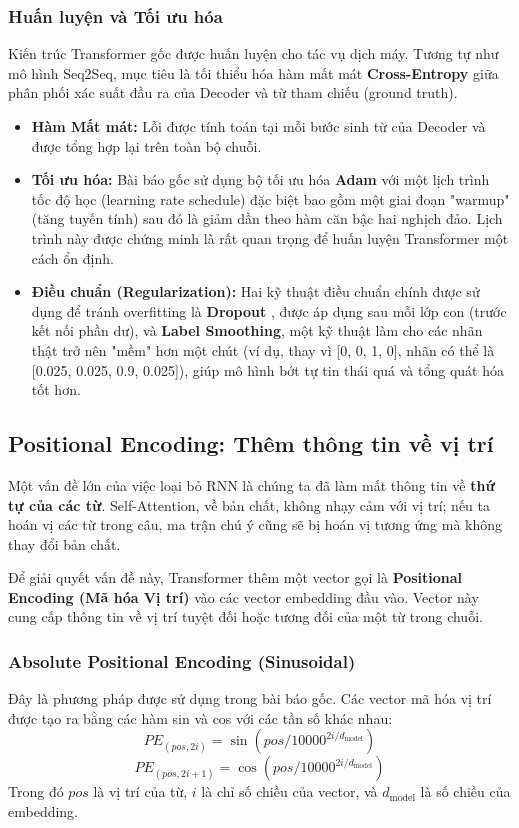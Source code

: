 \subsubsection{Huấn luyện và Tối ưu hóa}
\label{sssec:transformer_training}
Kiến trúc Transformer gốc được huấn luyện cho tác vụ dịch máy. Tương tự như mô hình Seq2Seq, mục tiêu là tối thiểu hóa hàm mất mát \textbf{Cross-Entropy} giữa phân phối xác suất đầu ra của Decoder và từ tham chiếu (ground truth).

\begin{itemize}
    \item \textbf{Hàm Mất mát:} Lỗi được tính toán tại mỗi bước sinh từ của Decoder và được tổng hợp lại trên toàn bộ chuỗi.
    \item \textbf{Tối ưu hóa:} Bài báo gốc sử dụng bộ tối ưu hóa \textbf{Adam} \cite{kingma2014adam} với một lịch trình tốc độ học (learning rate schedule) đặc biệt bao gồm một giai đoạn "warmup" (tăng tuyến tính) sau đó là giảm dần theo hàm căn bậc hai nghịch đảo. Lịch trình này được chứng minh là rất quan trọng để huấn luyện Transformer một cách ổn định.
    \item \textbf{Điều chuẩn (Regularization):} Hai kỹ thuật điều chuẩn chính được sử dụng để tránh overfitting là \textbf{Dropout} \cite{srivastava2014dropout}, được áp dụng sau mỗi lớp con (trước kết nối phần dư), và \textbf{Label Smoothing}, một kỹ thuật làm cho các nhãn thật trở nên "mềm" hơn một chút (ví dụ, thay vì [0, 0, 1, 0], nhãn có thể là [0.025, 0.025, 0.9, 0.025]), giúp mô hình bớt tự tin thái quá và tổng quát hóa tốt hơn.
\end{itemize}

\subsection{Positional Encoding: Thêm thông tin về vị trí}
\label{ssec:positional_encoding_intro}

Một vấn đề lớn của việc loại bỏ RNN là chúng ta đã làm mất thông tin về \textbf{thứ tự của các từ}. Self-Attention, về bản chất, không nhạy cảm với vị trí; nếu ta hoán vị các từ trong câu, ma trận chú ý cũng sẽ bị hoán vị tương ứng mà không thay đổi bản chất.

Để giải quyết vấn đề này, Transformer thêm một vector gọi là \textbf{Positional Encoding (Mã hóa Vị trí)} vào các vector embedding đầu vào. Vector này cung cấp thông tin về vị trí tuyệt đối hoặc tương đối của một từ trong chuỗi.

\subsubsection{Absolute Positional Encoding (Sinusoidal)}
Đây là phương pháp được sử dụng trong bài báo gốc. Các vector mã hóa vị trí được tạo ra bằng các hàm sin và cos với các tần số khác nhau:
$$ PE_{(pos, 2i)} = \sin(pos / 10000^{2i/d_{\text{model}}}) $$
$$ PE_{(pos, 2i+1)} = \cos(pos / 10000^{2i/d_{\text{model}}}) $$
Trong đó $pos$ là vị trí của từ, $i$ là chỉ số chiều của vector, và $d_{\text{model}}$ là số chiều của embedding.
